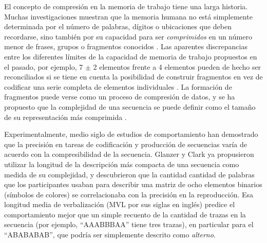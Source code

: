 El concepto de compresión en la memoria de trabajo tiene una larga historia. Muchas investigaciones muestran que la memoria humana no está simplemente determinada por el número de palabras, dígitos o ubicaciones que deben recordarse, sino también por su capacidad para ser \textit{comprimidos} en un número menor de frases, grupos o fragmentos conocidos \cite{f23,f24,f25,f26,feldman2000minimization,f28,f29}. Las aparentes discrepancias entre los diferentes límites de la capacidad de memoria de trabajo propuestos en el pasado, por ejemplo, 7 $\pm$ 2 elementos \cite{f29} frente a 4 elementos \cite{f25,f30} pueden de hecho ser reconciliados si se tiene en cuenta la posibilidad de construir fragmentos en vez de codificar una serie completa de elementos individuales \cite{f16,f31}. La formación de fragmentos puede verse como un proceso de compresión de datos, y se ha propuesto que la complejidad de una secuencia se puede definir como el tamaño de su representación más comprimida \cite{f16,f32,f33,f34}.


Experimentalmente, medio siglo de estudios de comportamiento han demostrado que la precisión en tareas de codificación y producción de secuencias varía de acuerdo con la compresibilidad de la secuencia. Glanzer y Clark \cite{f35} ya propusieron utilizar la longitud de la descripción más compacta de una secuencia como medida de su complejidad, y descubrieron que la cantidad cantidad de palabras que los participantes usaban para describir una matriz de ocho elementos binarios (símbolos de colores) se correlacionaba con la precisión en la reproducción. Esa longitud media de verbalización (MVL por sus siglas en inglés) predice el comportamiento mejor que un simple recuento de la cantidad de trazas en la secuencia (por ejemplo, ``AAABBBAA'' tiene tres trazas), en particular para el ``ABABABAB'', que podría ser simplemente descrito como \textit{alterno}.

